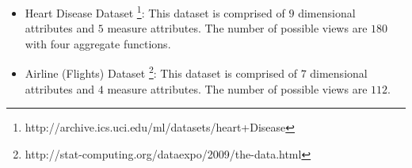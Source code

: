 \begin{itemize}
	\item Heart Disease Dataset \footnote{http://archive.ics.uci.edu/ml/datasets/heart+Disease}: This dataset is comprised of $9$ dimensional attributes and $5$ measure attributes. The number of possible views are $180$ with four aggregate functions.%
	\item Airline (Flights) Dataset \footnote{http://stat-computing.org/dataexpo/2009/the-data.html}: This dataset is comprised of $7$ dimensional attributes and $4$ measure attributes. The number of possible views are $112$.%
\end{itemize}

